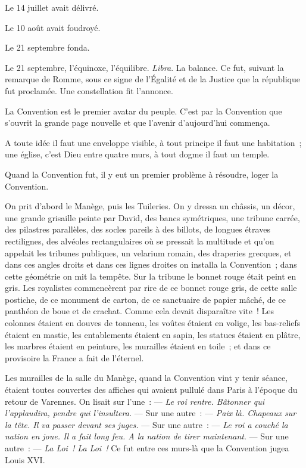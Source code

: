 \documentclass[french,twoside]{book} %
\begin{document}
\noindent Le 14 juillet avait délivré.\par
Le 10 août avait foudroyé.\par
Le 21 septembre fonda.\par
Le 21 septembre, l’équinoxe, l’équilibre. \emph{Libra}. La balance. Ce fut, suivant la remarque de Romme, sous ce signe de l’Égalité et de la Justice que la république fut proclamée. Une constellation fit l’annonce.\par
La Convention est le premier avatar du peuple.  C’est par la Convention que s’ouvrit la grande page nouvelle et que l’avenir d’aujourd’hui commença.\par
A toute idée il faut une enveloppe visible, à tout principe il faut une habitation ; une église, c’est Dieu entre quatre murs, à tout dogme il faut un temple.\par
Quand la Convention fut, il y eut un premier problème à résoudre, loger la Convention.\par
On prit d’abord le Manège, puis les Tuileries. On y dressa un châssis, un décor, une grande grisaille peinte par David, des bancs symétriques, une tribune carrée, des pilastres parallèles, des socles pareils à des billots, de longues étraves rectilignes, des alvéoles rectangulaires où se pressait la multitude et qu’on appelait les tribunes publiques, un velarium romain, des draperies grecques, et dans ces angles droits et dans ces lignes droites on installa la Convention ; dans cette géométrie on mit la tempête. Sur la tribune le bonnet rouge était peint en gris. Les royalistes commencèrent par rire de ce bonnet rouge gris, de cette salle postiche, de ce monument de carton, de ce sanctuaire de papier mâché, de ce panthéon de boue et de crachat. Comme cela devait disparaître vite ! Les colonnes étaient en douves de tonneau, les voûtes étaient en volige, les bas-reliefs étaient en mastic, les entablements étaient en sapin, les statues étaient en plâtre, les marbres étaient en peinture, les murailles étaient en toile ; et dans ce provisoire la France a fait de l’éternel.\par
Les murailles de la salle du Manège, quand la Convention vint y tenir séance, étaient toutes couvertes  des affiches qui avaient pullulé dans Paris à l’époque du retour de Varennes. On lisait sur l’une : — \emph{Le roi rentre. Bâtonner qui l’applaudira, pendre qui l’insultera.} — Sur une autre : — \emph{Paix là. Chapeaux sur la tête. Il va passer devant ses juges.} — Sur une autre : — \emph{Le roi a couché la nation en joue. Il a fait long feu. A la nation de tirer maintenant}. — Sur une autre : — \emph{La Loi ! La Loi !} Ce fut entre ces murs-là que la Convention jugea Louis XVI.\par
\end{document}
